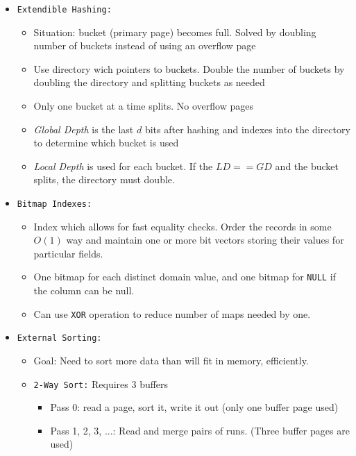 \documentclass[landscape,8pt]{extarticle}
\newcommand{\code}{\lstinline}
\begin{document}
\begin{multicols}{5}
\begin{itemize}
        \item \code{Extendible Hashing:}
              \begin{itemize}
                  \item Situation: bucket (primary page) becomes full. Solved by doubling number of buckets instead of using an overflow page
                  \item Use directory wich pointers to buckets. Double the number of buckets by doubling the directory and splitting buckets as needed
                  \item Only one bucket at a time splits. No overflow pages
                  \item \emph{Global Depth} is the last $d$ bits after hashing and indexes into the directory to determine which bucket is used
                  \item \emph{Local Depth} is used for each bucket. If the $LD == GD$ and the bucket splits, the directory must double.
              \end{itemize}
        \item \code{Bitmap Indexes:}
              \begin{itemize}
                  \item Index which allows for fast equality checks. Order the records in some $O(1)$ way and maintain one or more bit vectors storing their values for particular fields.
                  \item One bitmap for each distinct domain value, and one bitmap for \code{NULL} if the column can be null.
                  \item Can use \code{XOR} operation to reduce number of maps needed by one.
              \end{itemize}
        \item \code{External Sorting:}
              \begin{itemize}
                  \item Goal: Need to sort more data than will fit in memory, efficiently.
                  \item \code{2-Way Sort:} Requires 3 buffers
                        \begin{itemize}
                            \item Pass 0: read a page, sort it, write it out (only one buffer page used)
                            \item Pass 1, 2, 3, ...: Read and merge pairs of runs. (Three buffer pages are used)
                        \end{itemize}

\end{itemize}
\end{itemize}
\end{multicols}
\end{document}
